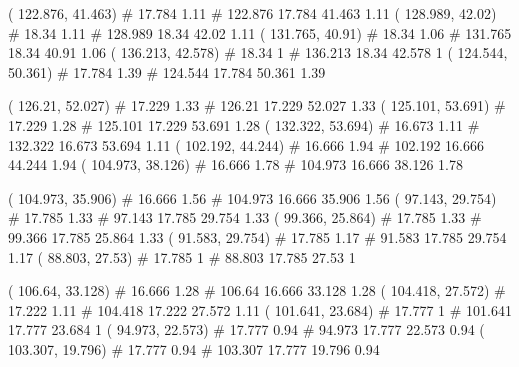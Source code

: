 \documentclass[a4paper,openbib,10pt]{article}
\newenvironment{treegraph}{\begin{graph}}{\end{graph}}
\begin{document}
\begin{treegraph}
  ( 122.876, 41.463) #     17.784    1.11
   #    122.876    17.784    41.463    1.11
  ( 128.989, 42.02) #     18.34    1.11
   #    128.989    18.34    42.02    1.11
  ( 131.765, 40.91) #     18.34    1.06
   #    131.765    18.34    40.91    1.06
  ( 136.213, 42.578) #     18.34    1
   #    136.213    18.34    42.578    1
  ( 124.544, 50.361) #     17.784    1.39
   #    124.544    17.784    50.361    1.39

  ( 126.21, 52.027) #     17.229    1.33
   #    126.21    17.229    52.027    1.33
  ( 125.101, 53.691) #     17.229    1.28
   #    125.101    17.229    53.691    1.28
  ( 132.322, 53.694) #     16.673    1.11
   #    132.322    16.673    53.694    1.11
  ( 102.192, 44.244) #     16.666    1.94
   #    102.192    16.666    44.244    1.94
  ( 104.973, 38.126) #     16.666    1.78
   #    104.973    16.666    38.126    1.78

  ( 104.973, 35.906) #     16.666    1.56
   #    104.973    16.666    35.906    1.56
  ( 97.143, 29.754) #     17.785    1.33
   #    97.143    17.785    29.754    1.33
  ( 99.366, 25.864) #     17.785    1.33
   #    99.366    17.785    25.864    1.33
  ( 91.583, 29.754) #     17.785    1.17
   #    91.583    17.785    29.754    1.17
  ( 88.803, 27.53) #     17.785    1
   #    88.803    17.785    27.53    1

  ( 106.64, 33.128) #     16.666    1.28
   #    106.64    16.666    33.128    1.28
  ( 104.418, 27.572) #     17.222    1.11
   #    104.418    17.222    27.572    1.11
  ( 101.641, 23.684) #     17.777    1
   #    101.641    17.777    23.684    1
  ( 94.973, 22.573) #     17.777    0.94
   #    94.973    17.777    22.573    0.94
  ( 103.307, 19.796) #     17.777    0.94
   #    103.307    17.777    19.796    0.94


\end{treegraph}
\end{document}
